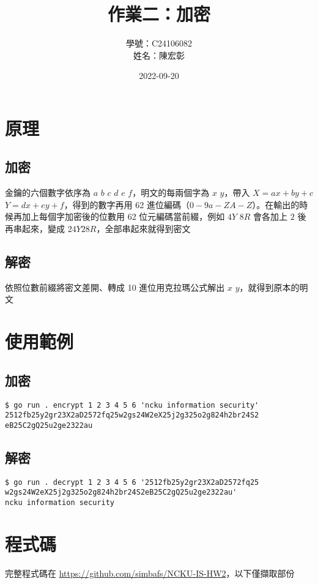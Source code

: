 \documentclass[12pt,a4paper]{article}
\title{作業二：加密}
\author{學號：C24106082\\
姓名：陳宏彰}
\date{2022-09-20}
\begin{document}
\maketitle  

\section{原理}
\subsection{加密}
金鑰的六個數字依序為 $a$ $b$ $c$ $d$ $e$ $f$，明文的每兩個字為 $x$ $y$，帶入 $X=ax+by+c$ $Y=dx+ey+f$，得到的數字再用 62 進位編碼（$0-9a-ZA-Z$）。在輸出的時候再加上每個字加密後的位數用 62 位元編碼當前綴，例如 $4Y$ $8R$ 會各加上 $2$ 後再串起來，變成 $24Y28R$，全部串起來就得到密文
    
\subsection{解密}
依照位數前綴將密文差開、轉成 10 進位用克拉瑪公式解出 $x$ $y$，就得到原本的明文

\section{使用範例}
\subsection{加密}
\begin{lstlisting}
$ go run . encrypt 1 2 3 4 5 6 'ncku information security'
2512fb25y2gr23X2aD2572fq25w2gs24W2eX25j2g325o2g824h2br24S2
eB25C2gQ25u2ge2322au
\end{lstlisting}

\subsection{解密}
\begin{lstlisting}
$ go run . decrypt 1 2 3 4 5 6 '2512fb25y2gr23X2aD2572fq25
w2gs24W2eX25j2g325o2g824h2br24S2eB25C2gQ25u2ge2322au'
ncku information security
\end{lstlisting}

\section{程式碼}
完整程式碼在 \url{https://github.com/simbafs/NCKU-IS-HW2}，以下僅擷取部份
\end{document}
